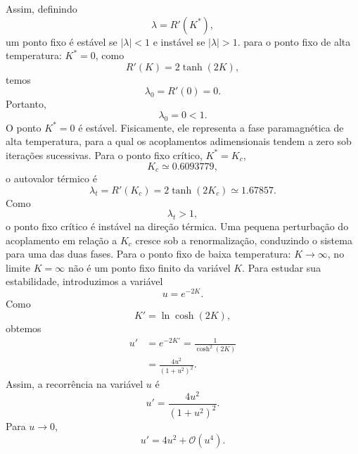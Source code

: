 \documentclass[12pt,a4paper]{article}
\begin{document}
%
Assim, definindo
%
\begin{equation}
    \lambda=R'(K^*),
\end{equation}
%
um ponto fixo é estável se $|\lambda|<1$ e instável se
$|\lambda|>1$.
%
para o ponto fixo de alta temperatura: $K^*=0$, como
%
\begin{equation}
    R'(K)=2\tanh(2K),
\end{equation}
%
temos
%
\begin{equation}
    \lambda_0=R'(0)=0.
\end{equation}
%
Portanto,
%
\begin{equation}
    \lambda_0=0<1.
\end{equation}
%
O ponto $K^*=0$ é estável. Fisicamente, ele representa a fase
paramagnética de alta temperatura, para a qual os acoplamentos
adimensionais tendem a zero sob iterações sucessivas. Para o ponto fixo crítico, $K^*=K_c$,
%
\begin{equation}
    K_c\simeq0.6093779,
\end{equation}
%
o autovalor térmico é
%
\begin{equation}
    \lambda_t
    =
    R'(K_c)
    =
    2\tanh(2K_c)
    \simeq1.67857.
\end{equation}
%
Como
%
\begin{equation}
    \lambda_t>1,
\end{equation}
%
o ponto fixo crítico é instável na direção térmica. Uma pequena
perturbação do acoplamento em relação a $K_c$ cresce sob a
renormalização, conduzindo o sistema para uma das duas fases.
Para o ponto fixo de baixa temperatura: $K\to\infty$, no limite $K=\infty$ não é um ponto fixo finito da variável $K$.
Para estudar sua estabilidade, introduzimos a variável
%
\begin{equation}
    u=e^{-2K}.
\end{equation}
%
Como
%
\begin{equation}
    K'=\ln\cosh(2K),
\end{equation}
%
obtemos
%
\begin{align}
    u'
    &=
    e^{-2K'}
    =
    \frac{1}{\cosh^2(2K)}
    \nonumber\\
    &=
    \frac{4u^2}{(1+u^2)^2}.
\end{align}
%
Assim, a recorrência na variável $u$ é
%
\begin{equation}
    u'=\frac{4u^2}{(1+u^2)^2}.
\end{equation}
%
Para $u\to0$,
%
\begin{equation}
    u'=4u^2+\mathcal O(u^4).
\end{equation}
\end{document}
